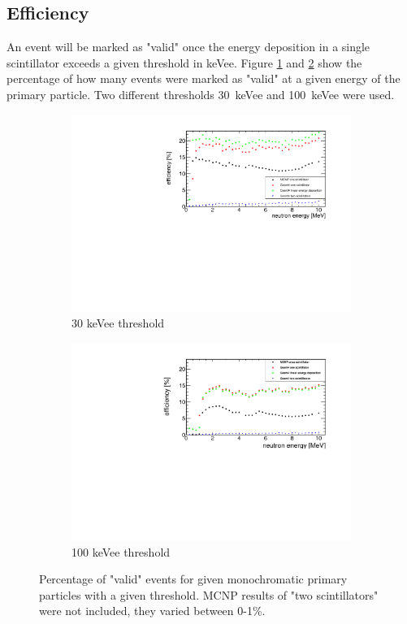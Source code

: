 \documentclass[12pt]{article}
\begin{document}
\subsection{Efficiency}

An event will be marked as "valid" once the energy deposition in a single scintillator exceeds a given threshold in keVee.  Figure \ref{fig:efficiency30} and \ref{fig:efficiency100} show the percentage of how many events were marked as "valid" at a given energy of the primary particle. Two different thresholds \SI{30}{keVee} and \SI{100}{keVee} were used.

 \begin{figure}[H]
 	\begin{subfigure}[t]{0.49\textwidth}
 		\includegraphics[width=\textwidth]{pics/efficiencyComplete30.pdf}
 		\caption{30 keVee threshold}
 		\label{fig:efficiency30}
 	\end{subfigure}
 	\begin{subfigure}[t]{0.49\textwidth}
 		\includegraphics[width=\textwidth]{pics/efficiencyComplete100.pdf}
 		\caption{100 keVee threshold}
 		\label{fig:efficiency100}
 	\end{subfigure}
 	\caption{Percentage of "valid" events for given monochromatic primary particles with a given threshold. MCNP results of "two scintillators" were not included, they varied between 0-1\%.}
 	\label{fig:efficiency}
 \end{figure}
 
\end{document}
